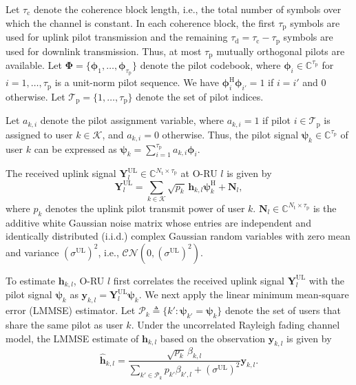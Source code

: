 \documentclass[10pt, conference]{IEEEtran}
\begin{document}
Let $\tau_\mathrm{c}$ denote the coherence block length, i.e., the total number of symbols over which the channel is constant. In each coherence block, the first $\tau_\mathrm{p}$ symbols are used for uplink pilot transmission and the remaining $\tau_\mathrm{d}=\tau_\mathrm{c}-\tau_\mathrm{p}$ symbols are used for downlink transmission. Thus, at most $\tau_\mathrm{p}$ mutually orthogonal pilots are available. Let $\boldsymbol{\Phi}=\{\boldsymbol{\phi}_1,\ldots,\boldsymbol{\phi}_{\tau_\mathrm{p}}\}$ denote the pilot codebook, where $\boldsymbol{\phi}_i\in\mathbb{C}^{\tau_\mathrm{p}}$ for $i=1,\ldots,\tau_\mathrm{p}$ is a unit-norm pilot sequence. We have $\boldsymbol{\phi}_i^\mathrm{H}\boldsymbol{\phi}_{i'}=1$ if $i=i'$ and $0$ otherwise. Let $\mathcal{T}_\mathrm{p}=\{1,\ldots,\tau_\mathrm{p}\}$ denote the set of pilot indices.

Let $a_{k,i}$ denote the pilot assignment variable, where $a_{k,i}=1$ if pilot $i\in\mathcal{T}_\mathrm{p}$ is assigned to user $k\in\mathcal{K}$, and $a_{k,i}=0$ otherwise. Thus, the pilot signal $\boldsymbol{\psi}_{k} \in \mathbb{C}^{\tau_\mathrm{p}}$ of user $k$ can be expressed as $\boldsymbol{\psi}_k=\sum_{i=1}^{\tau_\mathrm{p}} a_{k,i}\boldsymbol{\phi}_i$.

The received uplink signal $\mathbf{Y}_l^\textrm{UL} \in \mathbb{C}^{N_\textrm{t} \times \tau_\mathrm{p}}$ at O-RU $l$ is given by
\begin{equation}\label{eq:recv_uplink_signal}
    \mathbf{Y}_l^\textrm{UL}
    =
    \sum_{k\in\mathcal{K}} \sqrt{p_k}\,\mathbf{h}_{k,l}\boldsymbol{\psi}_k^\mathrm{H}
    + \mathbf{N}_l,
\end{equation}
where $p_k$ denotes the uplink pilot transmit power of user $k$. $\mathbf{N}_l \in \mathbb{C}^{N_\textrm{t} \times \tau_\mathrm{p}}$ is the additive white Gaussian noise matrix whose entries are independent and identically distributed (i.i.d.) complex Gaussian random variables with zero mean and variance $\left(\sigma^{\mathrm{UL}}\right)^2$, i.e., $\mathcal{CN}\left(0,\left(\sigma^{\mathrm{UL}}\right)^2\right)$.

To estimate $\mathbf{h}_{k,l}$, O-RU $l$ first correlates the received uplink signal $\mathbf{Y}_l^\textrm{UL}$ with the pilot signal $\boldsymbol{\psi}_{k}$ as $\mathbf{y}_{k,l}=\mathbf{Y}_l^\textrm{UL}\boldsymbol{\psi}_k$.
We next apply the linear minimum mean-square error (LMMSE) estimator. Let $\mathcal{P}_k\triangleq\{k':\boldsymbol{\psi}_{k'}=\boldsymbol{\psi}_k\}$ denote the set of users that share the same pilot as user $k$. Under the uncorrelated Rayleigh fading channel model, the LMMSE estimate of $\mathbf{h}_{k,l}$ based on the observation $\mathbf{y}_{k,l}$ is given by
\begin{equation}\label{eq:lmmse_final}
    \hat{\mathbf{h}}_{k,l}
    =
    \frac{\sqrt{p_k}\,\beta_{k,l}}
    {\sum\limits_{k'\in\mathcal{P}_k} p_{k'}\beta_{k',l} + \left(\sigma^{\mathrm{UL}}\right)^2}
    \mathbf{y}_{k,l}.
\end{equation}
\end{document}
